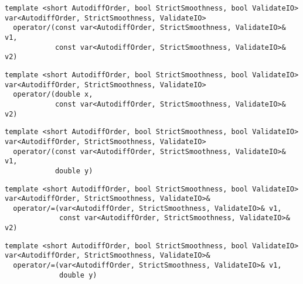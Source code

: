 \begin{tcolorbox}[colback=white,colframe=gray90, coltitle=black,boxrule=3pt,
fonttitle=\bfseries,title= Operator Division]

\begin{verbatim}
template <short AutodiffOrder, bool StrictSmoothness, bool ValidateIO>
var<AutodiffOrder, StrictSmoothness, ValidateIO>
  operator/(const var<AutodiffOrder, StrictSmoothness, ValidateIO>& v1,
            const var<AutodiffOrder, StrictSmoothness, ValidateIO>& v2)

\end{verbatim}

\begin{verbatim}
template <short AutodiffOrder, bool StrictSmoothness, bool ValidateIO>
var<AutodiffOrder, StrictSmoothness, ValidateIO>
  operator/(double x,
            const var<AutodiffOrder, StrictSmoothness, ValidateIO>& v2)

\end{verbatim}

\begin{verbatim}
template <short AutodiffOrder, bool StrictSmoothness, bool ValidateIO>
var<AutodiffOrder, StrictSmoothness, ValidateIO>
  operator/(const var<AutodiffOrder, StrictSmoothness, ValidateIO>& v1,
            double y)

\end{verbatim}

\end{tcolorbox}

\begin{tcolorbox}[colback=white,colframe=gray90, coltitle=black,boxrule=3pt,
fonttitle=\bfseries,title= Operator Division Assignment]

\begin{verbatim}
template <short AutodiffOrder, bool StrictSmoothness, bool ValidateIO>
var<AutodiffOrder, StrictSmoothness, ValidateIO>&
  operator/=(var<AutodiffOrder, StrictSmoothness, ValidateIO>& v1,
             const var<AutodiffOrder, StrictSmoothness, ValidateIO>& v2)

\end{verbatim}

\begin{verbatim}
template <short AutodiffOrder, bool StrictSmoothness, bool ValidateIO>
var<AutodiffOrder, StrictSmoothness, ValidateIO>&
  operator/=(var<AutodiffOrder, StrictSmoothness, ValidateIO>& v1,
             double y)

\end{verbatim}

\end{tcolorbox}

